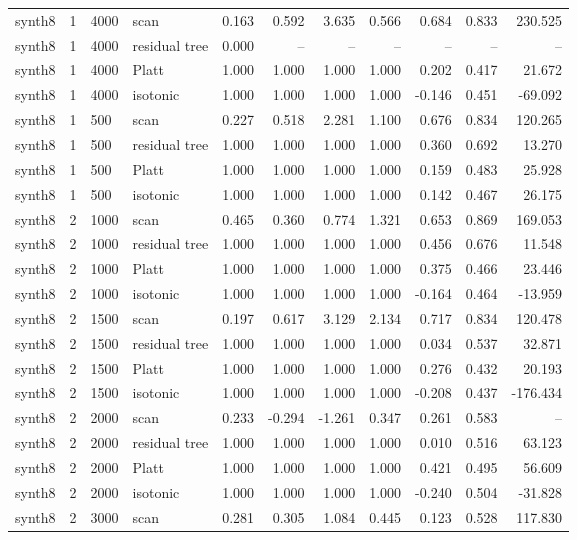 \begin{tabular}{lrllrrrrrrr}
synth8 & 1 & 4000 & scan & 0.163 & 0.592 & 3.635 & 0.566 & 0.684 & 0.833 & 230.525 \\
synth8 & 1 & 4000 & residual tree & 0.000 & -- & -- & -- & -- & -- & -- \\
synth8 & 1 & 4000 & Platt & 1.000 & 1.000 & 1.000 & 1.000 & 0.202 & 0.417 & 21.672 \\
synth8 & 1 & 4000 & isotonic & 1.000 & 1.000 & 1.000 & 1.000 & -0.146 & 0.451 & -69.092 \\
synth8 & 1 & 500 & scan & 0.227 & 0.518 & 2.281 & 1.100 & 0.676 & 0.834 & 120.265 \\
synth8 & 1 & 500 & residual tree & 1.000 & 1.000 & 1.000 & 1.000 & 0.360 & 0.692 & 13.270 \\
synth8 & 1 & 500 & Platt & 1.000 & 1.000 & 1.000 & 1.000 & 0.159 & 0.483 & 25.928 \\
synth8 & 1 & 500 & isotonic & 1.000 & 1.000 & 1.000 & 1.000 & 0.142 & 0.467 & 26.175 \\
synth8 & 2 & 1000 & scan & 0.465 & 0.360 & 0.774 & 1.321 & 0.653 & 0.869 & 169.053 \\
synth8 & 2 & 1000 & residual tree & 1.000 & 1.000 & 1.000 & 1.000 & 0.456 & 0.676 & 11.548 \\
synth8 & 2 & 1000 & Platt & 1.000 & 1.000 & 1.000 & 1.000 & 0.375 & 0.466 & 23.446 \\
synth8 & 2 & 1000 & isotonic & 1.000 & 1.000 & 1.000 & 1.000 & -0.164 & 0.464 & -13.959 \\
synth8 & 2 & 1500 & scan & 0.197 & 0.617 & 3.129 & 2.134 & 0.717 & 0.834 & 120.478 \\
synth8 & 2 & 1500 & residual tree & 1.000 & 1.000 & 1.000 & 1.000 & 0.034 & 0.537 & 32.871 \\
synth8 & 2 & 1500 & Platt & 1.000 & 1.000 & 1.000 & 1.000 & 0.276 & 0.432 & 20.193 \\
synth8 & 2 & 1500 & isotonic & 1.000 & 1.000 & 1.000 & 1.000 & -0.208 & 0.437 & -176.434 \\
synth8 & 2 & 2000 & scan & 0.233 & -0.294 & -1.261 & 0.347 & 0.261 & 0.583 & -- \\
synth8 & 2 & 2000 & residual tree & 1.000 & 1.000 & 1.000 & 1.000 & 0.010 & 0.516 & 63.123 \\
synth8 & 2 & 2000 & Platt & 1.000 & 1.000 & 1.000 & 1.000 & 0.421 & 0.495 & 56.609 \\
synth8 & 2 & 2000 & isotonic & 1.000 & 1.000 & 1.000 & 1.000 & -0.240 & 0.504 & -31.828 \\
synth8 & 2 & 3000 & scan & 0.281 & 0.305 & 1.084 & 0.445 & 0.123 & 0.528 & 117.830 \\

\end{tabular}
